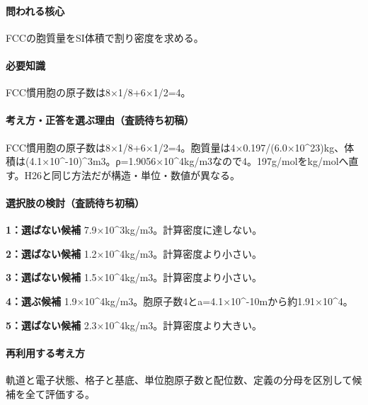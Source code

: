 \paragraph{問われる核心} FCCの胞質量をSI体積で割り密度を求める。

\paragraph{必要知識} FCC慣用胞の原子数は8×1/8+6×1/2=\allowbreak{}4。

\paragraph{考え方・正答を選ぶ理由（査読待ち初稿）} FCC慣用胞の原子数は8×1/8+6×1/2=\allowbreak{}4。胞質量は4×0.197/(6.0×10\textasciicircum{}23)kg、体積は(4.1×10\textasciicircum{}-10)\textasciicircum{}3m3。ρ=1.9056×10\textasciicircum{}4kg/m3なので4。197g/molをkg/molへ直す。H26と同じ方法だが構造・単位・数値が異なる。

\paragraph{選択肢の検討（査読待ち初稿）}\mbox{}\par

\noindent\textbf{1：選ばない候補} 7.9×10\textasciicircum{}3kg/m3。計算密度に達しない。\par

\noindent\textbf{2：選ばない候補} 1.2×10\textasciicircum{}4kg/m3。計算密度より小さい。\par

\noindent\textbf{3：選ばない候補} 1.5×10\textasciicircum{}4kg/m3。計算密度より小さい。\par

\noindent\textbf{4：選ぶ候補} 1.9×10\textasciicircum{}4kg/m3。胞原子数4とa=\allowbreak{}4.1×10\textasciicircum{}-10mから約1.91×10\textasciicircum{}4。\par

\noindent\textbf{5：選ばない候補} 2.3×10\textasciicircum{}4kg/m3。計算密度より大きい。\par

\paragraph{再利用する考え方} 軌道と電子状態、格子と基底、単位胞原子数と配位数、定義の分母を区別して候補を全て評価する。

